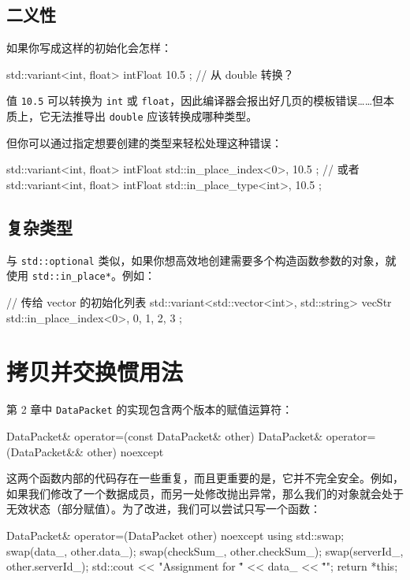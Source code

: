 \subsection{二义性}

如果你写成这样的初始化会怎样：

\begin{codebox}[cpp]
std::variant<int, float> intFloat { 10.5 }; // 从 double 转换？
\end{codebox}

值 \texttt{10.5} 可以转换为 \texttt{int} 或 \texttt{float}，因此编译器会报出好几页的模板错误……但本质上，它无法推导出 \texttt{double} 应该转换成哪种类型。

但你可以通过指定想要创建的类型来轻松处理这种错误：

\begin{codebox}[cpp]
std::variant<int, float> intFloat { std::in_place_index<0>, 10.5 };
// 或者
std::variant<int, float> intFloat { std::in_place_type<int>, 10.5 };
\end{codebox}

\subsection{复杂类型}

与 \texttt{std::optional} 类似，如果你想高效地创建需要多个构造函数参数的对象，就使用 \texttt{std::in\_place*}。例如：

\begin{codebox}[cpp]
// 传给 vector 的初始化列表
std::variant<std::vector<int>, std::string> vecStr {
std::in_place_index<0>, { 0, 1, 2, 3 }
};
\end{codebox}

\section{拷贝并交换惯用法}

第 2 章中 \texttt{DataPacket} 的实现包含两个版本的赋值运算符：

\begin{codebox}[cpp]
DataPacket& operator=(const DataPacket& other) { }
DataPacket& operator=(DataPacket&& other) noexcept {}
\end{codebox}

这两个函数内部的代码存在一些重复，而且更重要的是，它并不完全安全。例如，如果我们修改了一个数据成员，而另一处修改抛出异常，那么我们的对象就会处于无效状态（部分赋值）。为了改进，我们可以尝试只写一个函数：

\begin{codebox}[cpp]
DataPacket& operator=(DataPacket other) noexcept {
using std::swap;
swap(data_, other.data_);
swap(checkSum_, other.checkSum_);
swap(serverId_, other.serverId_);
std::cout << "Assignment for \"" << data_ << "\"\n";
return *this;
}
\end{codebox}

